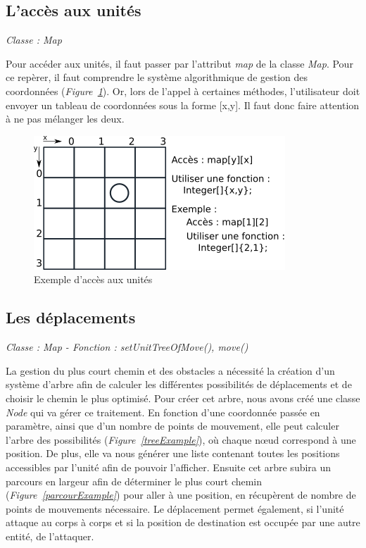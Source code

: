 \documentclass[a4paper, titlepage]{livret}
\begin{document}
        \subsection{L'accès aux unités}
          \begin{center}
           \textit{Classe : Map}
          \end{center}
          Pour accéder aux unités, il faut passer par l'attribut \textit{map} de la classe \textit{Map}. Pour ce repèrer, il faut comprendre le système algorithmique de gestion des coordonnées (\textit{Figure~\ref{xyExample}}). Or, lors de l'appel à certaines méthodes, l'utilisateur doit envoyer un tableau de coordonnées sous la forme [x,y]. Il faut donc faire attention à ne pas mélanger les deux.
        
        \begin{figure}[th]
          \begin{center}
            \includegraphics[scale=0.6]{Assets/xyExemple.png}
            \caption{Exemple d'accès aux unités}
            \label{xyExample}
          \end{center}
        \end{figure}
        
        
        \subsection{Les déplacements}
        \begin{center}
          \textit{Classe : Map - Fonction : setUnitTreeOfMove(), move()}
        \end{center}
          La gestion du plus court chemin et des obstacles a nécessité la création d'un système d'arbre afin de calculer les différentes possibilités de déplacements et de choisir le chemin le plus optimisé. Pour créer cet arbre, nous avons créé une classe \textit{Node} qui va gérer ce traitement. En fonction d'une coordonnée passée en paramètre, ainsi que d'un nombre de points de mouvement, elle peut calculer l'arbre des possibilités (\textit{Figure~\ref{treeExample}}), où chaque nœud correspond à une position. De plus, elle va nous générer une liste contenant toutes les positions accessibles par l'unité afin de pouvoir l'afficher. Ensuite cet arbre subira un parcours en largeur afin de déterminer le plus court chemin (\textit{Figure~\ref{parcourExample}}) pour aller à une position, en récupèrent de nombre de points de mouvements nécessaire. Le déplacement permet également, si l'unité attaque au corps à corps et si la position de destination est occupée par une autre entité, de l'attaquer.
          
\end{document}

